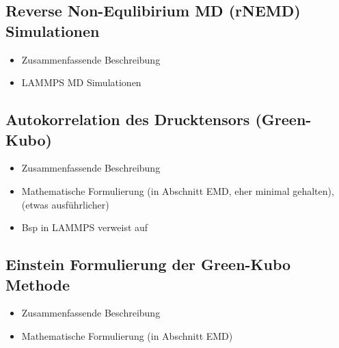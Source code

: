 \documentclass[a4paper, 10pt, 
               numbers=noenddot, toc=graduated,
               headsepline=true, footsepline=true,
               twoside=false, titlepage=true, 
               bibliography=totoc]{scrartcl}
\begin{document}
\subsection{Reverse Non-Equlibirium MD  (rNEMD) Simulationen}
	\begin{itemize}
		 \item Zusammenfassende Beschreibung \cite{Tenney2010} 
		 \item LAMMPS MD Simulationen \cite{Tenney2010} 
	\end{itemize}



\subsection{Autokorrelation des Drucktensors (Green-Kubo)}
	\begin{itemize}
		 \item Zusammenfassende Beschreibung \cite{Tenney2010}
		 \item Mathematische Formulierung  \cite{Tenney2010} (in Abschnitt EMD, eher minimal gehalten), \cite{Kirova2015} (etwas ausführlicher)
		 \item Bsp in LAMMPS verweist auf \cite{Daivis1994}
	\end{itemize}

\subsection{Einstein Formulierung der Green-Kubo Methode}
	\begin{itemize}
		 \item Zusammenfassende Beschreibung \cite{Tenney2010}
		 \item Mathematische Formulierung  \cite{Tenney2010} (in Abschnitt EMD)
	\end{itemize}






\end{document}
